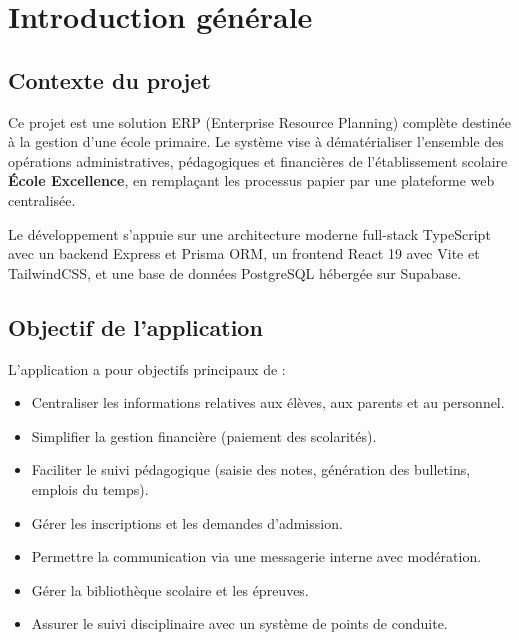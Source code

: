 \documentclass[12pt,a4paper]{report}
\begin{document}
 
\tableofcontents
 
\chapter{Introduction générale}
 
\section{Contexte du projet}
Ce projet est une solution ERP (Enterprise Resource Planning) complète destinée à la gestion d'une école primaire. Le système vise à dématérialiser l'ensemble des opérations administratives, pédagogiques et financières de l'établissement scolaire \textbf{École Excellence}, en remplaçant les processus papier par une plateforme web centralisée.

Le développement s'appuie sur une architecture moderne full-stack TypeScript avec un backend Express et Prisma ORM, un frontend React 19 avec Vite et TailwindCSS, et une base de données PostgreSQL hébergée sur Supabase.

\section{Objectif de l'application}
L'application a pour objectifs principaux de :
\begin{itemize}[leftmargin=*]
    \item Centraliser les informations relatives aux élèves, aux parents et au personnel.
    \item Simplifier la gestion financière (paiement des scolarités).
    \item Faciliter le suivi pédagogique (saisie des notes, génération des bulletins, emplois du temps).
    \item Gérer les inscriptions et les demandes d'admission.
    \item Permettre la communication via une messagerie interne avec modération.
    \item Gérer la bibliothèque scolaire et les épreuves.
    \item Assurer le suivi disciplinaire avec un système de points de conduite.
\end{itemize}
 
\end{document}
